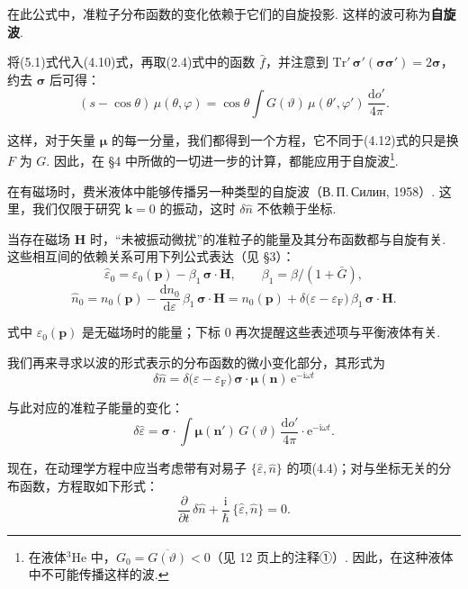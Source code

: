在此公式中，准粒子分布函数的变化依赖于它们的自旋投影. 这样的波可称为\textbf{自旋波}.

将(5.1)式代入(4.10)式，再取(2.4)式中的函数 $\hat f$，并注意到 $\mathrm{Tr}'\,\bm\sigma'(\bm\sigma\bm\sigma')=2\bm\sigma$，约去 $\bm\sigma$ 后可得：
\begin{equation}
(s-\cos\theta)\,\mu(\theta,\varphi)=\cos\theta\int G(\vartheta)\,\mu(\theta',\varphi')\,\frac{\mathrm{d}o'}{4\pi}.
\end{equation}

这样，对于矢量 $\bm\mu$ 的每一分量，我们都得到一个方程，它不同于(4.12)式的只是换 $F$ 为 $G$. 因此，在 §4 中所做的一切进一步的计算，都能应用于自旋波\footnote{在液体$^{3}$He 中，$G_{0}=\overline{G(\vartheta)}<0$（见 12 页上的注释①）. 因此，在这种液体中不可能传播这样的波.}.

在有磁场时，费米液体中能够传播另一种类型的自旋波（В.\,П.\,Силин, 1958）. 这里，我们仅限于研究 $\bm k=0$ 的振动，这时 $\delta\hat n$ 不依赖于坐标.

当存在磁场 $\bm H$ 时，“未被振动微扰”的准粒子的能量及其分布函数都与自旋有关. 这些相互间的依赖关系可用下列公式表达（见 §3）：
\begin{equation}
\hat\varepsilon_{0}=\varepsilon_{0}(\bm p)-\beta_{1}\,\bm\sigma\cdot\bm H,\qquad
\beta_{1}=\beta/(1+\bar G),
\end{equation}
\begin{equation}
\hat n_{0}=n_{0}(\bm p)-\frac{\mathrm{d}n_{0}}{\mathrm{d}\varepsilon}\,\beta_{1}\,\bm\sigma\cdot\bm H
=n_{0}(\bm p)+\delta\bigl(\varepsilon-\varepsilon_{\mathrm F}\bigr)\,\beta_{1}\,\bm\sigma\cdot\bm H.
\end{equation}

式中 $\varepsilon_{0}(\bm p)$ 是无磁场时的能量；下标 0 再次提醒这些表述项与平衡液体有关.

我们再来寻求以波的形式表示的分布函数的微小变化部分，其形式为
\begin{equation*}
\delta\hat n=\delta\bigl(\varepsilon-\varepsilon_{\mathrm F}\bigr)\,\bm\sigma\cdot\bm\mu(\bm n)\,\mathrm{e}^{-\mathrm{i}\omega t}
\end{equation*}

与此对应的准粒子能量的变化：
\begin{equation*}
\delta\hat\varepsilon=\bm\sigma\cdot\int\bm\mu(\bm n')\,G(\vartheta)\,\frac{\mathrm{d}o'}{4\pi}\cdot\mathrm{e}^{-\mathrm{i}\omega t}.
\end{equation*}

现在，在动理学方程中应当考虑带有对易子 $\{\hat\varepsilon,\hat n\}$ 的项(4.4)；对与坐标无关的分布函数，方程取如下形式：
\begin{equation}
\frac{\partial}{\partial t}\,\delta\hat n+\frac{\mathrm{i}}{\hbar}\,\{\hat\varepsilon,\hat n\}=0.
\end{equation}

